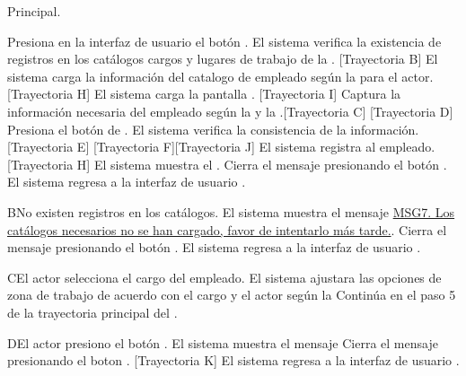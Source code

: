 \begin{UCtrayectoria}{Principal.}
	
	\UCpaso[\UCactor] Presiona en la interfaz de usuario  el botón \IUbutton{+}.
	\UCpaso  El sistema verifica la existencia de registros en los catálogos cargos  y  lugares de trabajo de la  . [Trayectoria B] 
	\UCpaso El sistema carga la información del catalogo de empleado  según la  para el actor. [Trayectoria H]
	\UCpaso El sistema carga la pantalla  . [Trayectoria I]
	\UCpaso[\UCactor] Captura la información necesaria del empleado según la  y la .[Trayectoria C] [Trayectoria D] 
	\UCpaso[\UCactor]  Presiona el botón de .
	\UCpaso El sistema verifica la consistencia de la información. [Trayectoria E] [Trayectoria F][Trayectoria J]
	\UCpaso El sistema registra al empleado. [Trayectoria H]
	\UCpaso  El sistema muestra el .    
	\UCpaso[\UCactor] Cierra el mensaje presionando el botón .
	\UCpaso El sistema regresa a la interfaz de usuario .
\end{UCtrayectoria}


\begin{UCtrayectoriaA}{B}{No existen registros en los catálogos.}
	\UCpaso El sistema muestra el mensaje \hyperref[MSG7]{MSG7. Los catálogos necesarios no se han cargado, favor de intentarlo más tarde.}.
	\UCpaso[\UCactor] Cierra el mensaje presionando el botón .
	\UCpaso El sistema regresa a la interfaz de usuario .
\end{UCtrayectoriaA}

\begin{UCtrayectoriaA}{C}{El actor selecciona el cargo del empleado.}
	\UCpaso     El sistema ajustara las opciones de zona de trabajo de acuerdo con el cargo y el actor según la 
	\UCpaso Continúa en el paso 5 de la trayectoria principal del .
\end{UCtrayectoriaA}

\begin{UCtrayectoriaA}{D}{El actor presiono el botón .}
	\UCpaso El sistema muestra el mensaje 
	\UCpaso[\UCactor] Cierra el mensaje presionando el boton . [Trayectoria K]
	\UCpaso El sistema regresa a la interfaz de usuario .
\end{UCtrayectoriaA}


